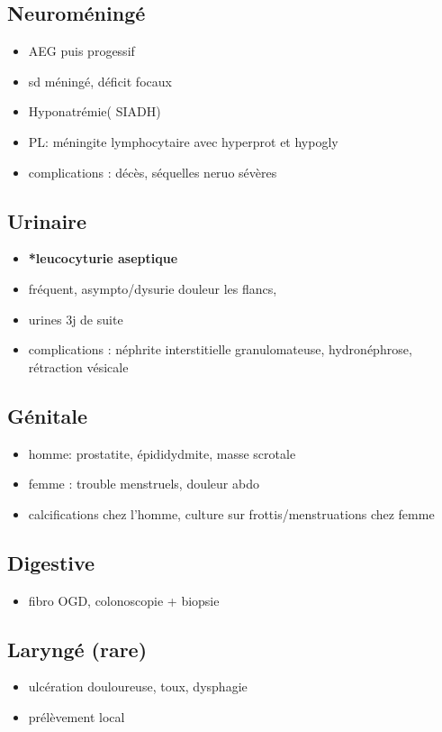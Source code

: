 \documentclass[a4paper,11pt,twoside,twocolumn]{article}
\begin{document}
\subsection*{Neuroméningé}
\label{sec:org77905c4}
\begin{itemize}
\item AEG puis progessif
\item sd méningé, déficit focaux
\item Hyponatrémie( SIADH)
\item PL: méningite lymphocytaire avec hyperprot et hypogly
\item complications : décès, séquelles neruo sévères
\end{itemize}
\subsection*{Urinaire}
\label{sec:orgd1b69f4}
\begin{itemize}
\item \textbf{*leucocyturie aseptique}
\item fréquent, asympto/dysurie douleur les flancs,
\item urines 3j de suite
\item complications : néphrite interstitielle granulomateuse, hydronéphrose, rétraction vésicale
\end{itemize}

\subsection*{Génitale}
\label{sec:orgeaea2f2}
\begin{itemize}
\item homme: prostatite, épididydmite, masse scrotale
\item femme : trouble menstruels, douleur abdo
\item calcifications chez l'homme, culture sur frottis/menstruations chez femme
\end{itemize}
\subsection*{Digestive}
\label{sec:org57bccff}
\begin{itemize}
\item fibro OGD, colonoscopie + biopsie
\end{itemize}
\subsection*{Laryngé (rare)}
\label{sec:org2d2e6e4}
\begin{itemize}
\item ulcération douloureuse, toux, dysphagie
\item prélèvement local
\end{itemize}
\end{document}
